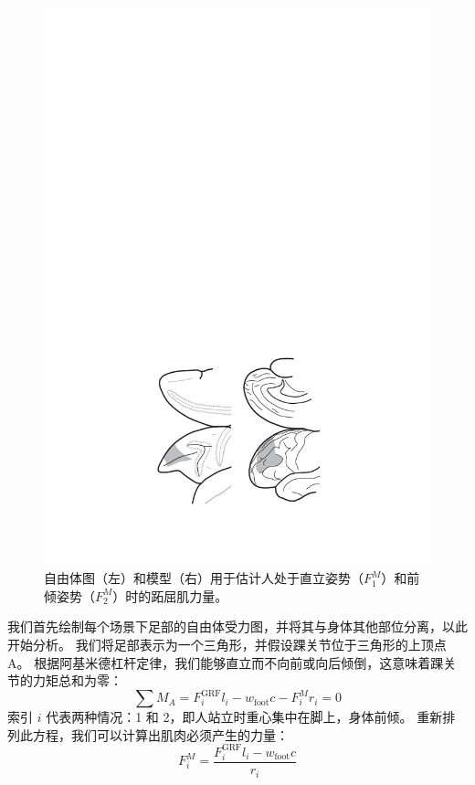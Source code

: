 \begin{figure}[!htb]
	\centering
	\includegraphics[width=0.9\linewidth]{chap6/6_1}
	\caption{自由体图（左）和模型（右）用于估计人处于直立姿势（$F_1^M$）和前倾姿势（$F_2^M$）时的跖屈肌力量。 \label{fig:6_1}}
\end{figure}


我们首先绘制每个场景下足部的自由体受力图，并将其与身体其他部位分离，以此开始分析。
我们将足部表示为一个三角形，并假设踝关节位于三角形的上顶点A。
根据阿基米德杠杆定律，我们能够直立而不向前或向后倾倒，这意味着踝关节的力矩总和为零：
%
\begin{equation}
	\sum M_A = F_i ^{\text{GRF}} l_i 
				- w_\text{foot} c
				- F_i ^M r_i
				= 0
	\label{eq:6_1}
\end{equation}
%
索引 $i$ 代表两种情况：1 和 2，即人站立时重心集中在脚上，身体前倾。
重新排列此方程，我们可以计算出肌肉必须产生的力量：
%
\begin{equation}
	F_i ^M = 
		\frac{
			F_i ^{\text{GRF}} l_i
			- w_\text{foot} c
		}{
			r_i
		}
	\label{eq:6_2}
\end{equation}


